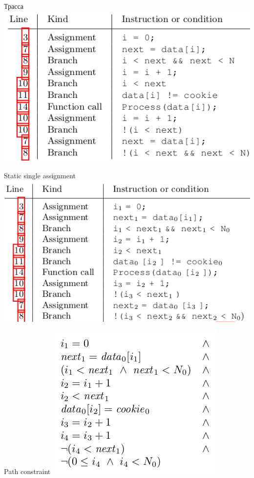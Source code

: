 \documentclass{beamer}
\begin{document}
\begin{frame}{Трасса}
\includegraphics[scale=0.5]{trace1.png}
\end{frame}

\begin{frame}{Static single assignment}
\includegraphics[scale=0.5]{static_single_assignment.png}
\end{frame}

\begin{frame}{Path constraint}
\includegraphics[scale=0.5]{path_constraint1.png}
\end{frame}
\end{document}
